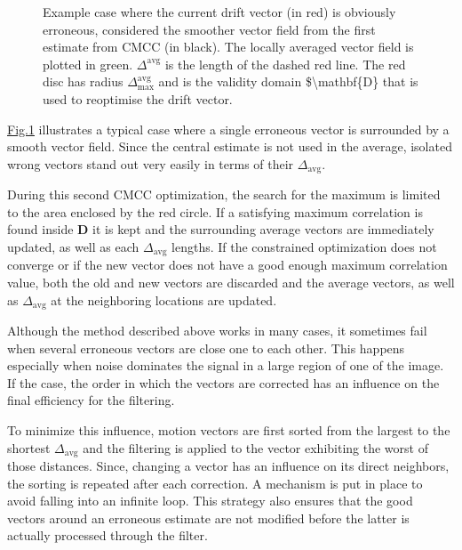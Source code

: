 \documentclass[letterpaper,10pt,english]{jupyterBook}
\begin{document}
\begin{figure}[htbp]
\centering
\capstart

\noindent{}
\caption{Example case where the current drift vector (in red) is obviously erroneous, considered the smoother vector field from the first estimate from
CMCC (in black). The locally averaged vector field is plotted in green. \(\Delta^{\textrm{avg}}\) is the length of the dashed red line.
The red disc has radius \(\Delta^{\textrm{avg}}_{\textrm{max}}\) and is the validity domain \$\textbackslash{}mathbf\{D\} that is used to re\sphinxhyphen{}optimise the drift vector.}\label{\detokenize{baseline_algorithm_definition:fig-filter}}\end{figure}

\sphinxAtStartPar
\hyperref[\detokenize{baseline_algorithm_definition:fig-filter}]{Fig.\@ \ref{\detokenize{baseline_algorithm_definition:fig-filter}}} illustrates a typical case where a single erroneous vector is surrounded by a smooth vector field. Since the central estimate is not used in the
average, isolated wrong vectors stand out very easily in terms of their \(\Delta_{\textrm{avg}}\).

\sphinxAtStartPar
During this second CMCC optimization, the search for the maximum is limited to the area enclosed by the red circle. If a satisfying maximum
correlation is found inside \(\mathbf{D}\) it is kept and the surrounding average vectors are immediately updated, as well as each
\(\Delta_{\textrm{avg}}\) lengths. If the constrained optimization does not converge or if the new vector does not have a good enough maximum
correlation value, both the old and new vectors are discarded and the average vectors, as well as \(\Delta_{\textrm{avg}}\) at the neighboring
locations are updated.

\sphinxAtStartPar
Although the method described above works in many cases, it sometimes fail when several erroneous vectors are close one to each other. This
happens especially when noise dominates the signal in a large region of one of the image. If the case, the order in which the vectors are
corrected has an influence on the final efficiency for the filtering.

\sphinxAtStartPar
To minimize this influence, motion vectors are first sorted from the largest to the shortest \(\Delta_{\textrm{avg}}\) and the filtering is
applied to the vector exhibiting the worst of those distances. Since, changing a vector has an influence on its direct neighbors, the sorting
is repeated after each correction. A mechanism is put in place to avoid falling into an infinite loop. This strategy also ensures that the good
vectors around an erroneous estimate are not modified before the latter is actually processed through the filter.
\end{document}
